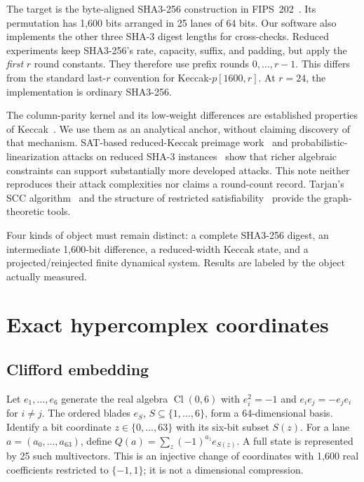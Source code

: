 \documentclass[11pt]{article}
\newcommand{\Cl}{\operatorname{Cl}}
\begin{document}
The target is the byte-aligned SHA3-256 construction in FIPS~202~\cite{fips202}. Its permutation has 1,600 bits arranged in 25 lanes of 64 bits. Our software also implements the other three SHA-3 digest lengths for cross-checks. Reduced experiments keep SHA3-256's rate, capacity, suffix, and padding, but apply the \emph{first} $r$ round constants. They therefore use prefix rounds $0,\ldots,r-1$. This differs from the standard last-$r$ convention for Keccak-$p[1600,r]$. At $r=24$, the implementation is ordinary SHA3-256.

The column-parity kernel and its low-weight differences are established properties of Keccak~\cite{keccakreference}. We use them as an analytical anchor, without claiming discovery of that mechanism. SAT-based reduced-Keccak preimage work~\cite{satkeccak} and probabilistic-linearization attacks on reduced SHA-3 instances~\cite{problinear} show that richer algebraic constraints can support substantially more developed attacks. This note neither reproduces their attack complexities nor claims a round-count record. Tarjan's SCC algorithm~\cite{tarjan} and the structure of restricted satisfiability~\cite{schaefer} provide the graph-theoretic tools.

Four kinds of object must remain distinct: a complete SHA3-256 digest, an intermediate 1,600-bit difference, a reduced-width Keccak state, and a projected/reinjected finite dynamical system. Results are labeled by the object actually measured.

\section{Exact hypercomplex coordinates}

\subsection{Clifford embedding}

Let $e_1,\ldots,e_6$ generate the real algebra $\Cl(0,6)$ with $e_i^2=-1$ and $e_i e_j=-e_j e_i$ for $i\ne j$. The ordered blades $e_S$, $S\subseteq\{1,\ldots,6\}$, form a 64-dimensional basis. Identify a bit coordinate $z\in\{0,\ldots,63\}$ with its six-bit subset $S(z)$. For a lane $a=(a_0,\ldots,a_{63})$, define $Q(a)=\sum_z(-1)^{a_z}e_{S(z)}$. A full state is represented by 25 such multivectors. This is an injective change of coordinates with 1,600 real coefficients restricted to $\{-1,1\}$; it is not a dimensional compression.
\end{document}
